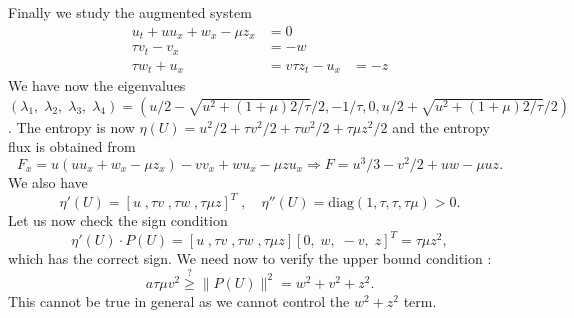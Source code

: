 \documentclass{article}
\theoremstyle{plain}
\theoremstyle{definition}
\numberwithin{theorem}{section}
\begin{document}
Finally we  study   the augmented system
\begin{subequations} \label{vkdvh3}
\begin{align}
    u_t +  u u_x  + w_x -\mu z_x & = 0 \\
    \tau v_t - v_x & = -w\\
        \tau w_t  + u_x  & = v
            \tau z_t - u_x & = -z
\end{align}
\end{subequations}
We have now the eigenvalues $(\lambda_1,\;\lambda_2,\;\lambda_3,\;\lambda_4)=(u/2 - \sqrt{u^2+(1+\mu)2/\tau}/2, -1/\tau, 0 , u/2 + \sqrt{u^2+(1+\mu)2/\tau}/2)$.
The entropy is now $\eta(U) =u^2/2 + \tau v^2/2 + \tau w^2/2 +\tau  \mu  z^2/2$ and the entropy flux is obtained from
$$
F_x = u( u u_x  + w_x -\mu z_x) - vv_x +wu_x -\mu z u_x  \Rightarrow  F=u^3/3  -v^2/2 + uw -\mu uz.
$$
We also have
$$
\eta'(U)= [u\;, \tau v\;, \tau w\;, \tau\mu z]^T\;,\quad 
\eta''(U) =  \text{diag}(1,\tau,\tau,\tau \mu) >0.
$$
Let us now check the  sign  condition
$$
\eta'(U)\cdot P(U) = [u\;, \tau v\;, \tau w\;, \tau\mu z] [ 0,\; w,\; -v,\; z ]^T = \tau \mu z^2 ,
$$
which has the correct sign. We need now to verify the upper bound  condition :
$$
  a \tau \mu   v^2 \stackrel{?}{\ge} \|P(U)\|^2 = w^2 + v^2 + z^2 .
$$
This cannot be true in general as we cannot control the $w^2 + z^2$ term.

%
%
%
\end{document}
